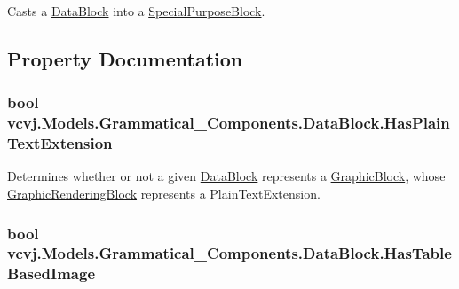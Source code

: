 Casts a \hyperlink{classvcvj_1_1_models_1_1_grammatical___components_1_1_data_block}{Data\+Block} into a \hyperlink{classvcvj_1_1_models_1_1_grammatical___components_1_1_special_purpose_block}{Special\+Purpose\+Block}. 



\subsection{Property Documentation}
\subsubsection[{\texorpdfstring{Has\+Plain\+Text\+Extension}{HasPlainTextExtension}}]{\setlength{\rightskip}{0pt plus 5cm}bool vcvj.\+Models.\+Grammatical\+\_\+\+Components.\+Data\+Block.\+Has\+Plain\+Text\+Extension\hspace{0.3cm}{\ttfamily [get]}}\hypertarget{classvcvj_1_1_models_1_1_grammatical___components_1_1_data_block_a6d08fab7e1c1ba82f00f220655f6aa9b}{}\label{classvcvj_1_1_models_1_1_grammatical___components_1_1_data_block_a6d08fab7e1c1ba82f00f220655f6aa9b}


Determines whether or not a given \hyperlink{classvcvj_1_1_models_1_1_grammatical___components_1_1_data_block}{Data\+Block} represents a \hyperlink{classvcvj_1_1_models_1_1_grammatical___components_1_1_graphic_block}{Graphic\+Block}, whose \hyperlink{classvcvj_1_1_models_1_1_grammatical___components_1_1_graphic_rendering_block}{Graphic\+Rendering\+Block} represents a Plain\+Text\+Extension. 

\subsubsection[{\texorpdfstring{Has\+Table\+Based\+Image}{HasTableBasedImage}}]{\setlength{\rightskip}{0pt plus 5cm}bool vcvj.\+Models.\+Grammatical\+\_\+\+Components.\+Data\+Block.\+Has\+Table\+Based\+Image\hspace{0.3cm}{\ttfamily [get]}}\hypertarget{classvcvj_1_1_models_1_1_grammatical___components_1_1_data_block_a5e1cede8610e08ba960710f5e5bf1293}{}\label{classvcvj_1_1_models_1_1_grammatical___components_1_1_data_block_a5e1cede8610e08ba960710f5e5bf1293}



